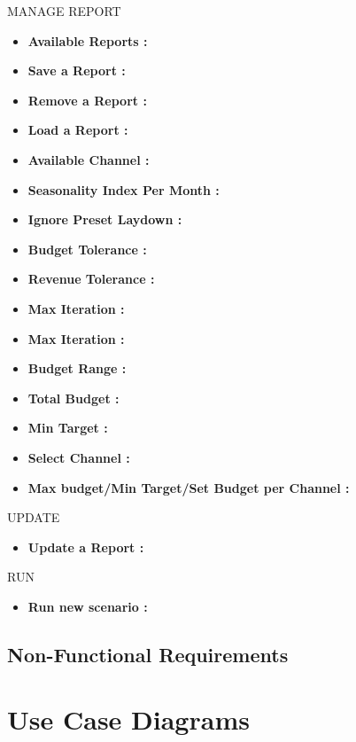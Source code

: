 \documentclass[12pt]{article}
\begin{document}
 	MANAGE REPORT
 		\begin{itemize}
 			\setlength{\itemindent}{+.5in}
 			\item \textbf{Available Reports : } 
 			\item \textbf{Save a Report : }
 			\item \textbf{Remove a Report : }
 			\item \textbf{Load a Report : } 
 			\item \textbf{Available Channel : } 
 			\item \textbf{Seasonality Index Per Month : }
 			\item \textbf{Ignore Preset Laydown : }
 			\item \textbf{Budget Tolerance : }
 			\item \textbf{Revenue Tolerance : }
 			\item \textbf{Max Iteration  : }
 			\item \textbf{Max Iteration  : }
 			\item \textbf{Budget Range : }
 			\item \textbf{Total Budget : }
 			\item \textbf{Min Target : }
 			\item \textbf{Select Channel : }
 			\item \textbf{Max budget/Min Target/Set Budget per Channel : }
 	\end{itemize}
 
  	UPDATE
    \begin{itemize}
    	\setlength{\itemindent}{+.5in}
    	\item \textbf{Update a Report : }
   \end{itemize}

  	RUN
   \begin{itemize}
   	   \setlength{\itemindent}{+.5in}
 	   \item \textbf{Run new scenario : }
   \end{itemize}

    \clearpage
    \newpage

	\subsection{Non-Functional Requirements}
	
	\clearpage
	\newpage
	
	\section{Use Case Diagrams}
\end{document}
